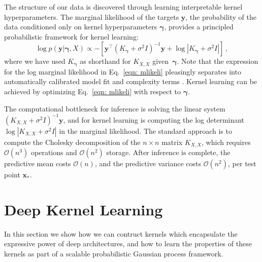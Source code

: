 \documentclass[twoside,11pt]{article}
\newcommand{\mbf}[1]{{\boldsymbol{\mathbf{#1}}}}
\renewcommand{\bm}{\mbf}
\begin{document}
The structure of our data is discovered through learning interpretable kernel hyperparameters.  The marginal likelihood of the targets $\bm{y}$, the probability of the data conditioned only on kernel hyperparameters $\bm{\gamma}$, provides a principled probabilistic framework for kernel learning:
\begin{equation}
 \log p(\bm{y} | \bm{\gamma}, X) \propto -[\bm{y}^{\top}(K_{\bm{\gamma}}+\sigma^2 I)^{-1}\bm{y} + \log|K_{\bm{\gamma}} + \sigma^2 I|]\,,  \label{eqn: mlikeli}
\end{equation}
where we have used $K_{\bm{\gamma}}$ as shorthand for $K_{X,X}$ given~$\bm{\gamma}$.  Note that the expression for the log marginal likelihood in
Eq.~\eqref{eqn: mlikeli} pleasingly separates into automatically calibrated model fit and complexity terms \citep{rasmussen01}.
Kernel learning can be achieved by optimizing Eq.~\eqref{eqn: mlikeli} with respect to $\bm{\gamma}$.

The computational bottleneck for inference is solving the linear system
$(K_{X,X}+\sigma^2 I)^{-1}\bm{y}$, and for kernel learning is computing
the log determinant $\log|K_{X,X}+ \sigma^2 I|$ in the marginal likelihood.  
The standard approach is to compute the Cholesky decomposition of the
$n \times n$ matrix $K_{X,X}$, which
requires $\mathcal{O}(n^3)$ operations and $\mathcal{O}(n^2)$ storage.
After inference is complete, the predictive mean costs $\mathcal{O}(n)$,
and the predictive variance costs $\mathcal{O}(n^2)$, per test point
$\bm{x}_*$.


\section{Deep Kernel Learning}
\label{sec: dkl}

In this section we show how we can contruct kernels which encapsulate the expressive power of deep
architectures, and how to learn
the properties of these kernels as part of a scalable probabilistic
Gaussian process framework.
\end{document}
